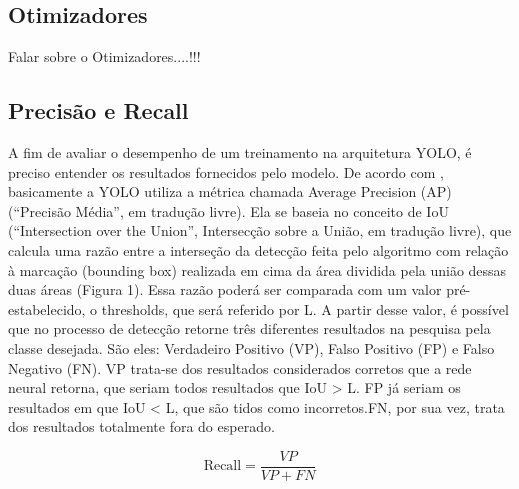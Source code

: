 
\subsection{Otimizadores}
\label{sec:otimizadores}

Falar sobre o Otimizadores....!!!

\subsection{Precisão e Recall}
\label{sec:precisaorecall}

A fim de avaliar o desempenho de um treinamento na arquitetura YOLO, é preciso entender os resultados fornecidos pelo modelo. De acordo com \cite{padilla2020survey}, basicamente a YOLO utiliza a métrica chamada Average Precision (AP) (“Precisão Média”, em tradução livre). Ela se baseia no conceito de IoU (“Intersection over the Union”, Intersecção sobre a União, em tradução livre), que calcula uma razão entre a interseção da detecção feita pelo algoritmo com relação à marcação (bounding box) realizada em cima da área dividida pela união dessas duas áreas (Figura 1). Essa razão poderá ser comparada com um valor pré-estabelecido, o thresholds, que será referido por L. A partir desse valor, é possível que no processo de detecção retorne três diferentes resultados na pesquisa pela classe desejada. São eles: Verdadeiro Positivo (VP), Falso Positivo (FP) e Falso Negativo (FN). VP trata-se dos resultados considerados corretos que a rede neural retorna, que seriam todos resultados que IoU > L. FP já seriam os resultados em que IoU < L, que são tidos como incorretos.FN, por sua vez, trata dos resultados totalmente fora do esperado.

\begin{equation}
    \text{Recall} = \frac{VP}{VP + FN} \tag{1}
\end{equation}
    
